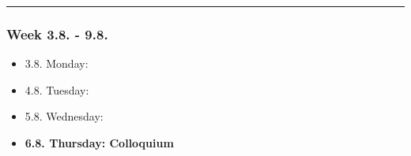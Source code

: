 \hrule
\subsubsection*{Week 3.8. - 9.8.}
\begin{itemize}
  \item  3.8. Monday:
  \item  4.8. Tuesday:
  \item  5.8. Wednesday:
  \item \textbf{6.8. Thursday: Colloquium}
\end{itemize}
